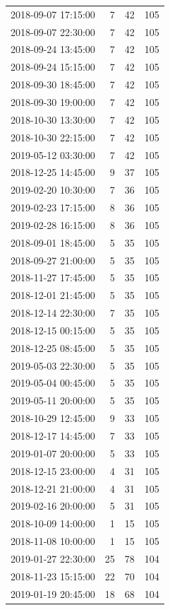 \begin{tabular}{lrrr}
2018-09-07 17:15:00 & 7 & 42 & 105 \\
2018-09-07 22:30:00 & 7 & 42 & 105 \\
2018-09-24 13:45:00 & 7 & 42 & 105 \\
2018-09-24 15:15:00 & 7 & 42 & 105 \\
2018-09-30 18:45:00 & 7 & 42 & 105 \\
2018-09-30 19:00:00 & 7 & 42 & 105 \\
2018-10-30 13:30:00 & 7 & 42 & 105 \\
2018-10-30 22:15:00 & 7 & 42 & 105 \\
2019-05-12 03:30:00 & 7 & 42 & 105 \\
2018-12-25 14:45:00 & 9 & 37 & 105 \\
2019-02-20 10:30:00 & 7 & 36 & 105 \\
2019-02-23 17:15:00 & 8 & 36 & 105 \\
2019-02-28 16:15:00 & 8 & 36 & 105 \\
2018-09-01 18:45:00 & 5 & 35 & 105 \\
2018-09-27 21:00:00 & 5 & 35 & 105 \\
2018-11-27 17:45:00 & 5 & 35 & 105 \\
2018-12-01 21:45:00 & 5 & 35 & 105 \\
2018-12-14 22:30:00 & 7 & 35 & 105 \\
2018-12-15 00:15:00 & 5 & 35 & 105 \\
2018-12-25 08:45:00 & 5 & 35 & 105 \\
2019-05-03 22:30:00 & 5 & 35 & 105 \\
2019-05-04 00:45:00 & 5 & 35 & 105 \\
2019-05-11 20:00:00 & 5 & 35 & 105 \\
2018-10-29 12:45:00 & 9 & 33 & 105 \\
2018-12-17 14:45:00 & 7 & 33 & 105 \\
2019-01-07 20:00:00 & 5 & 33 & 105 \\
2018-12-15 23:00:00 & 4 & 31 & 105 \\
2018-12-21 21:00:00 & 4 & 31 & 105 \\
2019-02-16 20:00:00 & 5 & 31 & 105 \\
2018-10-09 14:00:00 & 1 & 15 & 105 \\
2018-11-08 10:00:00 & 1 & 15 & 105 \\
2019-01-27 22:30:00 & 25 & 78 & 104 \\
2018-11-23 15:15:00 & 22 & 70 & 104 \\
2019-01-19 20:45:00 & 18 & 68 & 104 \\

\end{tabular}
